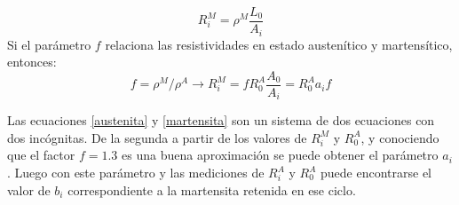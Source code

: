 \documentclass[a4paper,12pt,fleqn,twoside,openany]{book}
\begin{document}
\begin{equation}
 R^M _i = \rho ^M \frac{L_0}{A_i}
\end{equation}
Si el parámetro $f$ relaciona las resistividades en estado austenítico y martensítico, entonces:
\begin{equation}
 f=\rho^M / \rho^A \longrightarrow
 R^M _i = f R^A _0 \frac{A_0}{A_i} = R^A _0 a_i f \label{martensita}
\end{equation}

Las ecuaciones \ref{austenita} y \ref{martensita} son un sistema de dos ecuaciones con dos incógnitas. De la segunda a partir de los valores de $R^M _i$ y $R^A _0$, y conociendo que el factor $f = 1.3$ es una buena aproximación se puede obtener el parámetro $a_i$. Luego con este parámetro y las mediciones de $R^A _i$ y $R^A _0$ puede encontrarse el valor de $b_i$ correspondiente a la martensita retenida en ese ciclo.  
\end{document}
